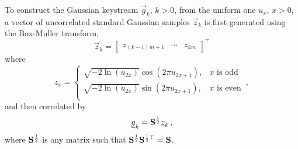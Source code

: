 \documentclass[conference]{IEEEtran}
\theoremstyle{definition}
\theoremstyle{remark}
\begin{document}
To construct the Gaussian keystream $\vec{g}_k$, $k>0$, from the uniform one $u_x$, $x>0$, a vector of uncorrelated standard Gaussian samples $\vec{z}_k$ is first generated using the Box-Muller transform,
\begin{equation}\label{eqn:standard_gaussian_generation}
    \vec{z}_k = 
  \begin{bmatrix}
    z_{(k-1)m+1} & \cdots & z_{km}
  \end{bmatrix}^\top
\end{equation}
where 
\begin{equation*}
  z_x =
  \begin{cases}
    \sqrt{-2\ln(u_{2x})}\cos(2\pi u_{2x+1}), & x \text{ is odd}\\
    \sqrt{-2\ln(u_{2x})}\sin(2\pi u_{2x+1}), & x \text{ is even}\\
  \end{cases}\,,
\end{equation*}
and then correlated by
\begin{equation}\label{eqn:gaussian_keystream_generation}
    \vec{g}_k = \mat{S}^\frac{1}{2}\vec{z}_k\,,
\end{equation}
where ${{\mathbf{S}}}^\frac{1}{2}$ is any matrix such that ${{\mathbf{S}}}^\frac{1}{2}{{\mathbf{S}}}^{\frac{1}{2}\top} = {{\mathbf{S}}}$.

% 
% 
\end{document}

